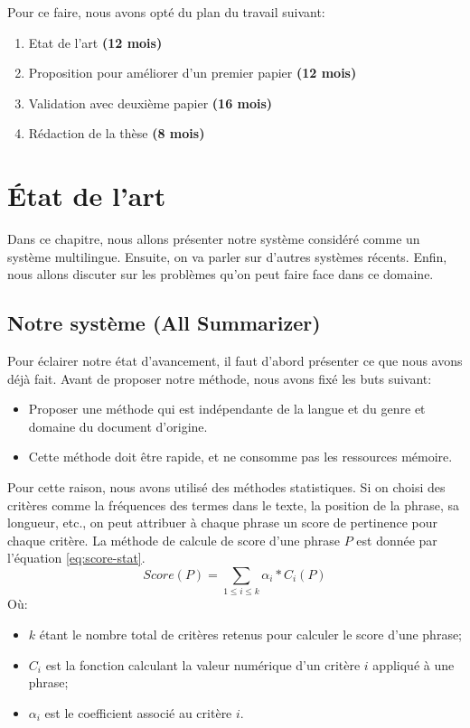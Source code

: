\documentclass[12pt, oneside, a4paper]{book}
\begin{document}
Pour ce faire, nous avons opté du plan du travail suivant:
\begin{enumerate}
\item Etat de l’art \textbf{(12 mois)}
\item Proposition pour améliorer d’un premier papier \textbf{(12 mois)}
\item Validation avec deuxième papier \textbf{(16 mois)}
\item Rédaction de la thèse \textbf{(8 mois)}
\end{enumerate}


\chapter{\'Etat de l'art}

Dans ce chapitre, nous allons présenter notre système considéré comme un système multilingue. 
Ensuite, on va parler sur d'autres systèmes récents. 
Enfin, nous allons discuter sur les problèmes qu'on peut faire face dans ce domaine.

\section{Notre système (All Summarizer)}

Pour éclairer notre état d'avancement, il faut d'abord présenter ce que nous avons déjà fait.
Avant de proposer notre méthode, nous avons fixé les buts suivant:
\begin{itemize}
\item Proposer une méthode qui est indépendante de la langue et du genre et domaine du document d'origine.
\item Cette méthode doit être rapide, et ne consomme pas les ressources mémoire.
\end{itemize}
Pour cette raison, nous avons utilisé des méthodes statistiques.
Si on choisi des critères comme la fréquences des termes dans le texte, la position de la phrase, sa longueur, etc., on peut attribuer à chaque phrase un score de pertinence pour chaque critère.
La méthode de calcule de score d'une phrase $P$ est donnée par l'équation \ref{eq:score-stat}. 
\begin{equation}
\label{eq:score-stat}
Score(P) = \sum_{1 \leq i \leq k} {\alpha_i * C_i(P)}
\end{equation}
Où:
\begin{itemize}
\item $k$ étant le nombre total de critères retenus pour calculer le score d'une phrase;
\item $C_i$ est la fonction calculant la valeur numérique d'un critère $ i $ appliqué à une phrase;
\item $\alpha_i$ est le coefficient associé au critère $ i $.
\end{itemize}
\end{document}
